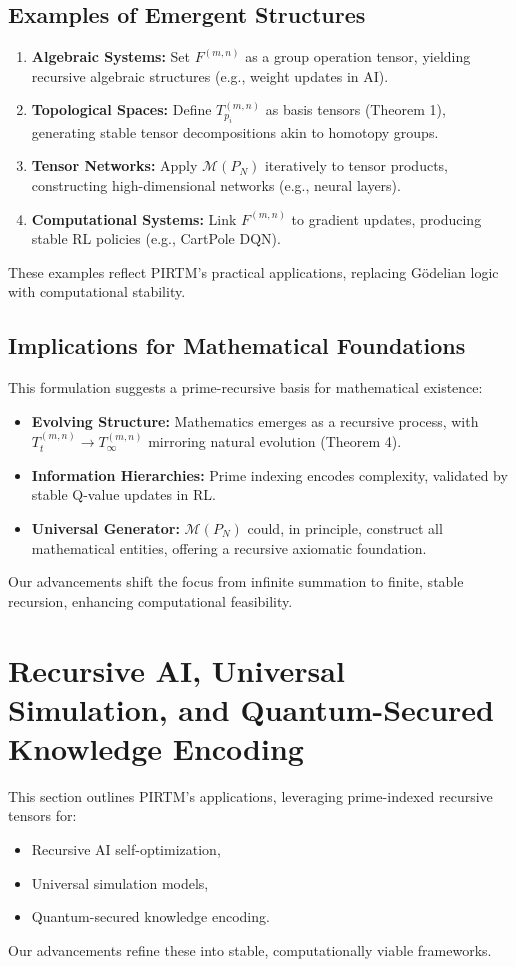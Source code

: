 \documentclass{article}
\theoremstyle{plain}
\begin{document}
\subsection{Examples of Emergent Structures}
\begin{enumerate}
    \item \textbf{Algebraic Systems:} Set \( F^{(m,n)} \) as a group operation tensor, yielding recursive algebraic structures (e.g., weight updates in AI).
    \item \textbf{Topological Spaces:} Define \( T_{p_i}^{(m,n)} \) as basis tensors (Theorem 1), generating stable tensor decompositions akin to homotopy groups.
    \item \textbf{Tensor Networks:} Apply \( \mathcal{M}(P_N) \) iteratively to tensor products, constructing high-dimensional networks (e.g., neural layers).
    \item \textbf{Computational Systems:} Link \( F^{(m,n)} \) to gradient updates, producing stable RL policies (e.g., CartPole DQN).
\end{enumerate}
These examples reflect PIRTM’s practical applications, replacing Gödelian logic with computational stability.

\subsection{Implications for Mathematical Foundations}
This formulation suggests a prime-recursive basis for mathematical existence:
\begin{itemize}
    \item \textbf{Evolving Structure:} Mathematics emerges as a recursive process, with \( T_t^{(m,n)} \to T_\infty^{(m,n)} \) mirroring natural evolution (Theorem 4).
    \item \textbf{Information Hierarchies:} Prime indexing encodes complexity, validated by stable Q-value updates in RL.
    \item \textbf{Universal Generator:} \( \mathcal{M}(P_N) \) could, in principle, construct all mathematical entities, offering a recursive axiomatic foundation.
\end{itemize}
Our advancements shift the focus from infinite summation to finite, stable recursion, enhancing computational feasibility.

\section{Recursive AI, Universal Simulation, and Quantum-Secured Knowledge Encoding}
This section outlines PIRTM’s applications, leveraging prime-indexed recursive tensors for:
\begin{itemize}
    \item Recursive AI self-optimization,
    \item Universal simulation models,
    \item Quantum-secured knowledge encoding.
\end{itemize}
Our advancements refine these into stable, computationally viable frameworks.
\end{document}
